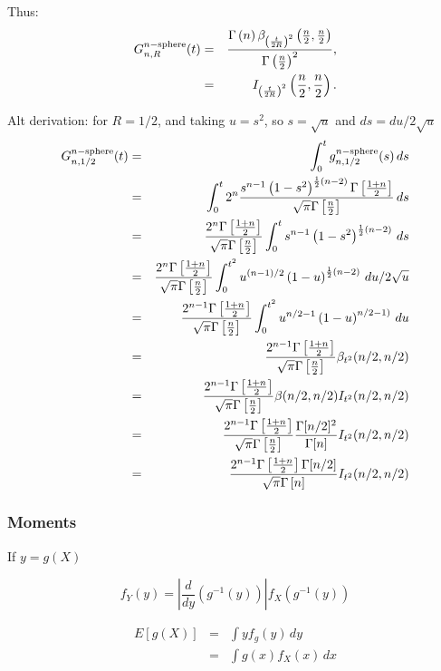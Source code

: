 Thus:
\begin{eqnarray}
G^{n-{\rm sphere}}_{n,R}(t)
    & = &\frac{\Gamma \left(n \right) {\beta}_{{\left(\frac{t}{2 R}\right)}^{2}}\left( \frac{n}{2},\frac{n}{2}\right)}
     {\Gamma\left(\frac{n}{2}\right)^{2}},  \nonumber \\   
     & = &  {I}_{{\left(\frac{t}{2 R}\right)}^{2}}\left( \frac{n}{2},\frac{n}{2}\right).
\end{eqnarray}




Alt derivation: for $R=1/2$, and taking $u=s^2$, so $s = \sqrt{u}$ and
$ds = du/2\sqrt{u}$
\begin{eqnarray}
G^{n-{\rm sphere}}_{n,1/2}(t)
    & = & \int_0^t g^{n-{\rm sphere}}_{n,1/2}(s) \, ds \nonumber \\
    & = & \int_0^t  2^n \frac{s^{n-1}
             \left(1 -s^2\right)^{\frac{1}{2} (n-2)}
             \Gamma\left[\frac{1+n}{2}\right]}{\sqrt{\pi }
             \Gamma\left[\frac{n}{2}\right]} 
             \, ds \nonumber \\    
    & = & \frac{ 2^n \Gamma\left[\frac{1+n}{2}\right]}{\sqrt{\pi}\Gamma\left[\frac{n}{2}\right]}
           \int_0^t s^{n-1}  \left(1 -s^2\right)^{\frac{1}{2} (n-2)}
             \, ds \nonumber \\    
    & = & \frac{ 2^n \Gamma\left[\frac{1+n}{2}\right]}{\sqrt{\pi}\Gamma\left[\frac{n}{2}\right]}
           \int_0^{t^2} u^{(n-1)/2}  \left(1 - u\right)^{\frac{1}{2} (n-2)}
             \, du/2\sqrt{u}  \nonumber \\    
    & = & \frac{ 2^{n-1} \Gamma\left[\frac{1+n}{2}\right]}{\sqrt{\pi}\Gamma\left[\frac{n}{2}\right]}
           \int_0^{t^2} u^{n/2-1}  \left(1 - u\right)^{n/2-1)}
             \, du  \nonumber \\    
    & = & \frac{ 2^{n-1} \Gamma\left[\frac{1+n}{2}\right]}{\sqrt{\pi}\Gamma\left[\frac{n}{2}\right]}
               \beta_{t^2}(n/2, n/2)  \nonumber \\    
    & = & \frac{ 2^{n-1} \Gamma\left[\frac{1+n}{2}\right]}{\sqrt{\pi}\Gamma\left[\frac{n}{2}\right]}
              \beta(n/2,n/2) I_{t^2}(n/2, n/2)  \nonumber \\    
    & = & \frac{ 2^{n-1} \Gamma\left[\frac{1+n}{2}\right]}{\sqrt{\pi}\Gamma\left[\frac{n}{2}\right]}
              \frac{\Gamma[n/2]^2}{\Gamma[n]} I_{t^2}(n/2, n/2)  \nonumber \\    
    & = & \frac{ 2^{n-1} \Gamma\left[\frac{1+n}{2}\right]\Gamma[n/2] }{\sqrt{\pi}\Gamma\left[n\right]}
              I_{t^2}(n/2, n/2)  \nonumber \\    
\end{eqnarray}




\subsubsection{Moments}


If $y = g(X)$

\[ f_Y(y) = \left| \frac{d}{dy} \left( g^{-1}(y) \right) \right|
               f_X\left( g^{-1}(y) \right)
\]


\begin{eqnarray}
 E[ g(X) ] & = & \int y f_g (y) \, dy \\
           & = & \int g(x) f_X(x) \, dx 
\end{eqnarray}

